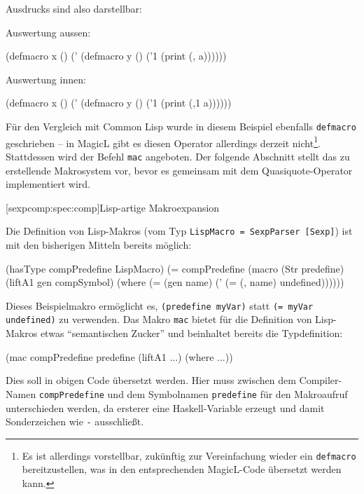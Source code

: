 \documentclass[11pt, a4paper, bibgerm]{scrbook}
\newenvironment{DIFnomarkup}{}{}
\newcommand\icode[1]{\lstinline?#1?}
\newcommand\lsubsection{}
\begin{document}
Ausdrucks sind also darstellbar:
\begin{DIFnomarkup}\begin{code}
Auswertung aussen:

(defmacro x ()
  (' (defmacro y ()
       ('1 (print (, a))))))


Auswertung innen:

(defmacro x ()
  (' (defmacro y ()
       ('1 (print (,1 a))))))
\end{code}\end{DIFnomarkup}
Für den Vergleich mit Common Lisp wurde in diesem Beispiel ebenfalls
\icode{defmacro} geschrieben -- in MagicL gibt es diesen Operator
allerdings derzeit nicht\footnote{Es ist allerdings vorstellbar,
  zukünftig zur Vereinfachung wieder ein \icode{defmacro}
  bereitzustellen, was in den entsprechenden MagicL-Code übersetzt
  werden kann.}. Stattdessen wird der Befehl \icode{mac} angeboten. Der
folgende Abschnitt stellt das zu erstellende Makrosystem vor, bevor es
gemeinsam mit dem Quasiquote-Operator implementiert wird.

\lsubsection[sexpcomp:spec:comp]{Lisp-artige Makroexpansion}

Die Definition von Lisp-Makros (vom Typ \icode{LispMacro = SexpParser [Sexp]}) ist mit
den bisherigen Mitteln bereits möglich:
\begin{DIFnomarkup}\begin{code}
(hasType compPredefine LispMacro)
(= compPredefine (macro (Str predefine)
                     (liftA1 gen compSymbol)
                   (where (= (gen name)
                             (' (= (, name) undefined))))))

\end{code}\end{DIFnomarkup}
Dieses Beispielmakro ermöglicht es, \icode{(predefine myVar)} statt
\icode{(= myVar undefined)} zu verwenden. Das Makro \icode{mac} bietet
für die Definition von Lisp-Makros etwas ``semantischen Zucker'' und
beinhaltet bereits die Typdefinition:
\begin{DIFnomarkup}\begin{code}
(mac compPredefine predefine
     (liftA1 ...)
   (where ...))
\end{code}\end{DIFnomarkup}
Dies soll in obigen Code übersetzt werden. Hier muss zwischen dem
Compiler-Namen \icode{compPredefine} und dem Symbolnamen
\icode{predefine} für den Makroaufruf unterschieden werden, da ersterer
eine Haskell-Variable erzeugt und damit Sonderzeichen wie \icode{-}
ausschließt.
\end{document}
